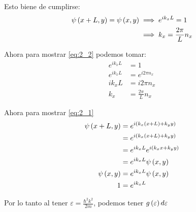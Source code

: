 \documentclass{report}
\begin{document}
Esto biene de cumplirse:
\begin{align}
  \psi\left(x + L, y\right) = \psi\left(x, y\right) &\implies e^{ik_x L} = 1\label{eq:2_1}\\
  &\implies k_x = \frac{2\pi}{L}n_x\label{eq:2_2}
\end{align}

Ahora para mostrar \ref{eq:2_2} podemos tomar:
\begin{align*}
  e^{ik_x L} &= 1\\
  e^{ik_x L} &= e^{i2\pi n_x}\\
  ik_x L &= i2\pi n_x\\
  k_x&= \frac{2\pi}{L} n_x
\end{align*}

Ahora para mostrar \ref{eq:2_1}
\begin{align*}
  \psi\left(x + L, y\right) &= e^{i\left(k_x (x + L) + k_y y\right)}\\
  &= e^{i\left(k_x (x + L) + k_y y\right)}\\
  &= e^{ik_x L}e^{i\left(k_x x + k_y y\right)}\\
  &= e^{ik_x L}\psi\left(x, y\right)\\
  \psi\left(x, y\right)&= e^{ik_x L}\psi\left(x, y\right)\\
  1 &= e^{ik_x L}
\end{align*}

Por lo tanto al tener $\varepsilon = \frac{\hbar^2k^2}{2m}$, podemos tener $g\left(\varepsilon\right)d\varepsilon$

\section{}

\section{}

\section{}

\chapter{}

\section{}
\end{document}

